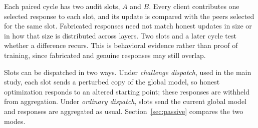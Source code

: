 \documentclass[journal]{IEEEtran}
\begin{document}
Each paired cycle has two audit slots, $A$ and $B$. Every client
contributes one selected response to each slot, and its update is
compared with the peers selected for the same slot. Fabricated responses
need not match honest updates in size or in how that size is distributed
across layers. Two slots and a later cycle test whether a difference
recurs. This is behavioral evidence rather than proof of training, since
fabricated and genuine responses may still overlap.

Slots can be dispatched in two ways. Under \emph{challenge dispatch}, used
in the main study, each slot sends a perturbed copy of the global model,
so honest optimization responds to an altered starting point; these
responses are withheld from aggregation. Under \emph{ordinary dispatch},
slots send the current global model and responses are aggregated as usual.
Section~\ref{sec:passive} compares the two modes.
\end{document}
